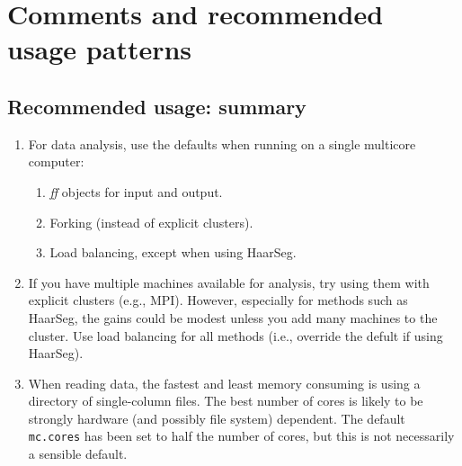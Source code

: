 \documentclass[a4paper,11pt]{article}
\begin{document}


            





\clearpage
\section{Comments and recommended usage patterns}
\label{commentsend}


\subsection{Recommended usage: summary}\label{comments-summary}


\begin{enumerate}
\item For data analysis, use the defaults when running on a single
  multicore computer:
  \begin{enumerate}
  \item \textit{ff} objects for input and output.
  \item Forking (instead of explicit clusters).
  \item Load balancing, except when using HaarSeg.
  \end{enumerate}

\item If you have multiple machines available for analysis, try using them
  with explicit clusters (e.g., MPI). However, especially for methods such
  as HaarSeg, the gains could be modest unless you add many machines to
  the cluster. Use load balancing for all methods (i.e., override the
  defult if using HaarSeg).

\item When reading data, the fastest and least memory consuming is using a
  directory of single-column files. The best number of cores is likely to
  be strongly hardware (and possibly file system) dependent. The default
  \texttt{mc.cores} has been set to half the number of cores, but this is
  not necessarily a sensible default.
\end{enumerate}
\end{document}
